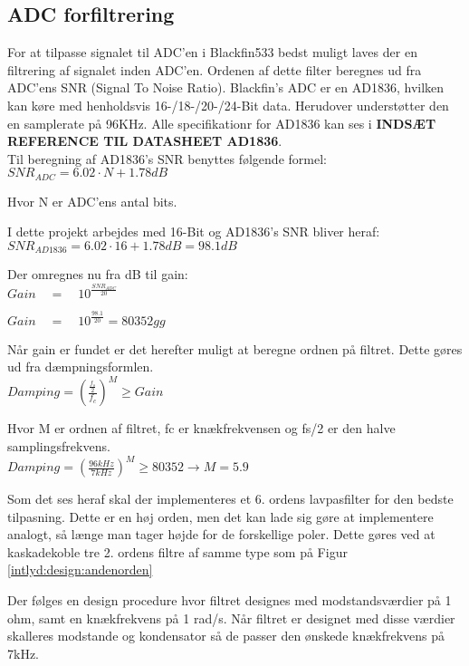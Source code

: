 
\subsection{ADC forfiltrering}

For at tilpasse signalet til ADC'en i Blackfin533 bedst muligt laves der en filtrering af signalet inden ADC'en. 
Ordenen af dette filter beregnes ud fra ADC'ens SNR (Signal To Noise Ratio). Blackfin's ADC er en AD1836, hvilken kan køre med henholdsvis 16-/18-/20-/24-Bit data. Herudover understøtter den en samplerate på 96KHz. Alle specifikationr for AD1836 kan ses i \textbf{INDSÆT REFERENCE TIL DATASHEET AD1836}. \\

Til beregning af AD1836's SNR benyttes følgende formel: \\
${ SNR }_{ ADC }=6.02\cdot N+1.78dB$

Hvor N er ADC'ens antal bits. 

I dette projekt arbejdes med 16-Bit og AD1836's SNR bliver heraf: \\
${ SNR }_{ AD1836 }=6.02\cdot 16+1.78dB = 98.1dB$

Der omregnes nu fra dB til gain: \\
$Gain\quad =\quad { 10 }^{ \frac { { SNR }_{ ADC } }{ 20 }  }$

$Gain\quad =\quad { 10 }^{ \frac { 98.1 }{ 20 }  }=80352gg$

Når gain er fundet er det herefter muligt at beregne ordnen på filtret. Dette gøres ud fra dæmpningsformlen. \\
$Damping={ \left( \frac { \frac { { f }_{ s } }{ 2 }  }{ { f }_{ c } }  \right)  }^{ M }\ge Gain$

Hvor M er ordnen af filtret, fc er knækfrekvensen og fs/2 er den halve samplingsfrekvens.\\
$Damping={ \left( \frac { 96kHz }{ 7kHz }  \right)  }^{ M }\ge 80352\rightarrow M=5.9$

Som det ses heraf skal der implementeres et 6. ordens lavpasfilter for den bedste tilpasning. Dette er en høj orden, men det kan lade sig gøre at implementere analogt, så længe man tager højde for de forskellige poler. 
Dette gøres ved at kaskadekoble tre 2. ordens filtre af samme type som på Figur \ref{intlyd:design:andenorden}


Der følges en design procedure hvor filtret designes med modstandsværdier på 1 ohm, samt en knækfrekvens på 1 rad/s. Når filtret er designet med disse værdier skalleres modstande og kondensator så de passer den ønskede knækfrekvens på 7kHz. 

